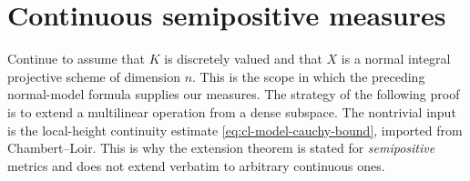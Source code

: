 \section{Continuous semipositive measures}
\label{sec:metrics-continuous-cl}

Continue to assume that $K$ is discretely valued and that $X$ is a
normal integral projective scheme of dimension $n$. This is the scope
in which the preceding normal-model formula supplies our measures.
The strategy of the
following proof is to extend a multilinear operation from a dense
subspace. The nontrivial input is the local-height continuity estimate
\eqref{eq:cl-model-cauchy-bound}, imported from Chambert--Loir. This is why
the extension theorem is stated for \emph{semipositive} metrics and does not
extend verbatim to arbitrary continuous ones.

